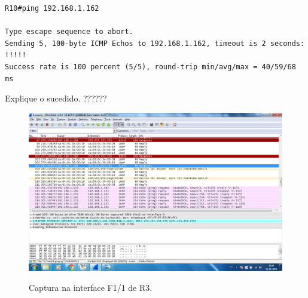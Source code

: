 \begin{verbatim}
R10#ping 192.168.1.162

Type escape sequence to abort.
Sending 5, 100-byte ICMP Echos to 192.168.1.162, timeout is 2 seconds:
!!!!!
Success rate is 100 percent (5/5), round-trip min/avg/max = 40/59/68 ms
\end{verbatim}

Explique o sucedido.     ??????

\begin{figure}[h]
\centering
\includegraphics[width=1\textwidth, height=0.45\textheight]{8.png}
\label{fig:captura}
\caption{Captura na interface F1/1 de \textsf{R3}.}
\end{figure}
